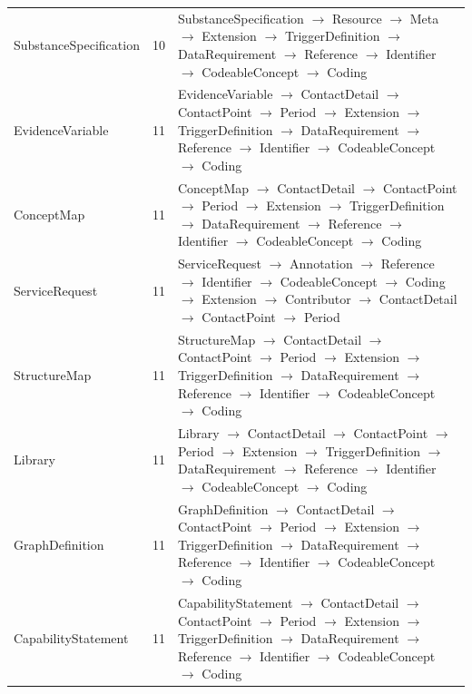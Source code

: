 \begin{longtable}{lrl}
SubstanceSpecification & 10 & SubstanceSpecification $\rightarrow$ Resource $\rightarrow$ Meta $\rightarrow$ Extension $\rightarrow$ TriggerDefinition $\rightarrow$ DataRequirement $\rightarrow$ Reference $\rightarrow$ Identifier $\rightarrow$ CodeableConcept $\rightarrow$ Coding \\
EvidenceVariable & 11 & EvidenceVariable $\rightarrow$ ContactDetail $\rightarrow$ ContactPoint $\rightarrow$ Period $\rightarrow$ Extension $\rightarrow$ TriggerDefinition $\rightarrow$ DataRequirement $\rightarrow$ Reference $\rightarrow$ Identifier $\rightarrow$ CodeableConcept $\rightarrow$ Coding \\
ConceptMap & 11 & ConceptMap $\rightarrow$ ContactDetail $\rightarrow$ ContactPoint $\rightarrow$ Period $\rightarrow$ Extension $\rightarrow$ TriggerDefinition $\rightarrow$ DataRequirement $\rightarrow$ Reference $\rightarrow$ Identifier $\rightarrow$ CodeableConcept $\rightarrow$ Coding \\
ServiceRequest & 11 & ServiceRequest $\rightarrow$ Annotation $\rightarrow$ Reference $\rightarrow$ Identifier $\rightarrow$ CodeableConcept $\rightarrow$ Coding $\rightarrow$ Extension $\rightarrow$ Contributor $\rightarrow$ ContactDetail $\rightarrow$ ContactPoint $\rightarrow$ Period \\
StructureMap & 11 & StructureMap $\rightarrow$ ContactDetail $\rightarrow$ ContactPoint $\rightarrow$ Period $\rightarrow$ Extension $\rightarrow$ TriggerDefinition $\rightarrow$ DataRequirement $\rightarrow$ Reference $\rightarrow$ Identifier $\rightarrow$ CodeableConcept $\rightarrow$ Coding \\
Library & 11 & Library $\rightarrow$ ContactDetail $\rightarrow$ ContactPoint $\rightarrow$ Period $\rightarrow$ Extension $\rightarrow$ TriggerDefinition $\rightarrow$ DataRequirement $\rightarrow$ Reference $\rightarrow$ Identifier $\rightarrow$ CodeableConcept $\rightarrow$ Coding \\
GraphDefinition & 11 & GraphDefinition $\rightarrow$ ContactDetail $\rightarrow$ ContactPoint $\rightarrow$ Period $\rightarrow$ Extension $\rightarrow$ TriggerDefinition $\rightarrow$ DataRequirement $\rightarrow$ Reference $\rightarrow$ Identifier $\rightarrow$ CodeableConcept $\rightarrow$ Coding \\
CapabilityStatement & 11 & CapabilityStatement $\rightarrow$ ContactDetail $\rightarrow$ ContactPoint $\rightarrow$ Period $\rightarrow$ Extension $\rightarrow$ TriggerDefinition $\rightarrow$ DataRequirement $\rightarrow$ Reference $\rightarrow$ Identifier $\rightarrow$ CodeableConcept $\rightarrow$ Coding \\

\end{longtable}
